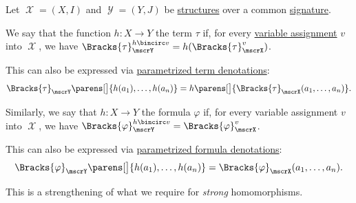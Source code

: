\begin{definition}\label{def:fol_function_respect}
  Let \( \mscrX = (X, I) \) and \( \mscrY = (Y, J) \) be \hyperref[def:fol_structure]{structures} over a common \hyperref[def:fol_signature]{signature}.

  \begin{thmenum}
     We say that the function \( h: X \to Y \)  the term \( \tau \) if, for every \hyperref[def:fol_variable_assignment]{variable assignment} \( v \) into \( \mscrX \), we have \( \Bracks{\tau}_\mscrY^{h \bincirc v} = h(\Bracks{\tau}_\mscrX^v) \).

    This can also be expressed via \hyperref[def:fol_parameterized_term_denotation]{parametrized term denotations}:
    \begin{equation}\label{eq:def:fol_function_respect/term}
      \Bracks{\tau}_\mscrY\parens[\big]{ h(a_1), \ldots, h(a_n) } = h\parens[\big]{ \Bracks{\tau}_\mscrX(a_1, \ldots, a_n) }.
    \end{equation}

     Similarly, we say that \( h: X \to Y \)  the formula \( \varphi \) if, for every variable assignment \( v \) into \( \mscrX \), we have \( \Bracks{\varphi}_\mscrY^{h \bincirc v} = \Bracks{\varphi}_\mscrX^v \).

    This can also be expressed via \hyperref[def:fol_parameterized_term_denotation]{parametrized formula denotations}:
    \begin{equation}\label{eq:def:fol_function_respect/formula}
      \Bracks{\varphi}_\mscrY\parens[\big]{ h(a_1), \ldots, h(a_n) } = \Bracks{\varphi}_\mscrX(a_1, \ldots, a_n).
    \end{equation}

    This is a strengthening of what we require for \emph{strong} homomorphisms.
  \end{thmenum}
\end{definition}

